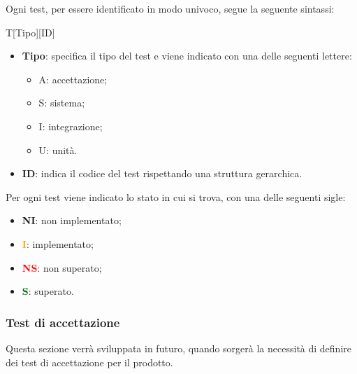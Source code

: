 Ogni test, per essere identificato in modo univoco, segue la seguente sintassi:
\begin{center}
	T[Tipo][ID]
\end{center}
\begin{itemize}
	\item \textbf{Tipo}: specifica il tipo del test	e viene indicato con una delle seguenti lettere:
	\begin{itemize}
		\item A: accettazione;
		\item S: sistema;
		\item I: integrazione;
		\item U: unità.
	\end{itemize}
	\item \textbf{ID}: indica il codice del test rispettando una struttura gerarchica.	
\end{itemize}
Per ogni test viene indicato lo stato in cui si trova, con una delle seguenti sigle:
\begin{itemize}
	\item \textbf{NI}: non implementato;
	\item \textcolor{orange}{\textbf{I}}: implementato;
	\item \textcolor{red}{\textbf{NS}}: non superato;
	\item \textcolor{darkgreen}{\textbf{S}}: superato.
\end{itemize}
\subsubsection{Test di accettazione}
Questa sezione verrà sviluppata in futuro, quando sorgerà la necessità di definire dei test di accettazione per il prodotto.
